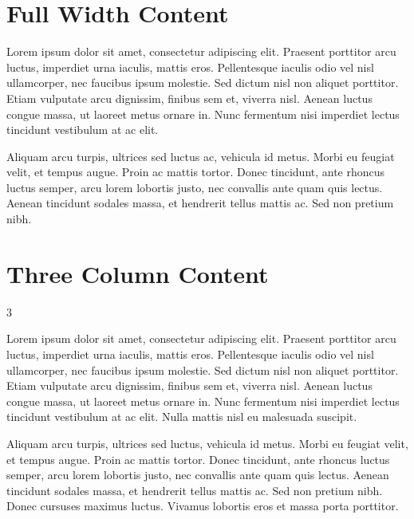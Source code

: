 \documentclass[
	a4paper, %
]{CSMakotoTechnicalReport}
\begin{document}
\section{Full Width Content}

Lorem ipsum dolor sit amet, consectetur adipiscing elit. Praesent porttitor arcu luctus, imperdiet urna iaculis, mattis eros. Pellentesque iaculis odio vel nisl ullamcorper, nec faucibus ipsum molestie. Sed dictum nisl non aliquet porttitor. Etiam vulputate arcu dignissim, finibus sem et, viverra nisl. Aenean luctus congue massa, ut laoreet metus ornare in. Nunc fermentum nisi imperdiet lectus tincidunt vestibulum at ac elit.

Aliquam arcu turpis, ultrices sed luctus ac, vehicula id metus. Morbi eu feugiat velit, et tempus augue. Proin ac mattis tortor. Donec tincidunt, ante rhoncus luctus semper, arcu lorem lobortis justo, nec convallis ante quam quis lectus. Aenean tincidunt sodales massa, et hendrerit tellus mattis ac. Sed non pretium nibh.


\section{Three Column Content}

\begin{multicols}{3} %

Lorem ipsum dolor sit amet, consectetur adipiscing elit. Praesent porttitor arcu luctus, imperdiet urna iaculis, mattis eros. Pellentesque iaculis odio vel nisl ullamcorper, nec faucibus ipsum molestie. Sed dictum nisl non aliquet porttitor. Etiam vulputate arcu dignissim, finibus sem et, viverra nisl. Aenean luctus congue massa, ut laoreet metus ornare in. Nunc fermentum nisi imperdiet lectus tincidunt vestibulum at ac elit. Nulla mattis nisl eu malesuada suscipit.

Aliquam arcu turpis, ultrices sed luctus, vehicula id metus. Morbi eu feugiat velit, et tempus augue. Proin ac mattis tortor. Donec tincidunt, ante rhoncus luctus semper, arcu lorem lobortis justo, nec convallis ante quam quis lectus. Aenean tincidunt sodales massa, et hendrerit tellus mattis ac. Sed non pretium nibh. Donec cursuses maximus luctus. Vivamus lobortis eros et massa porta porttitor.

\end{multicols} %
\end{document}
